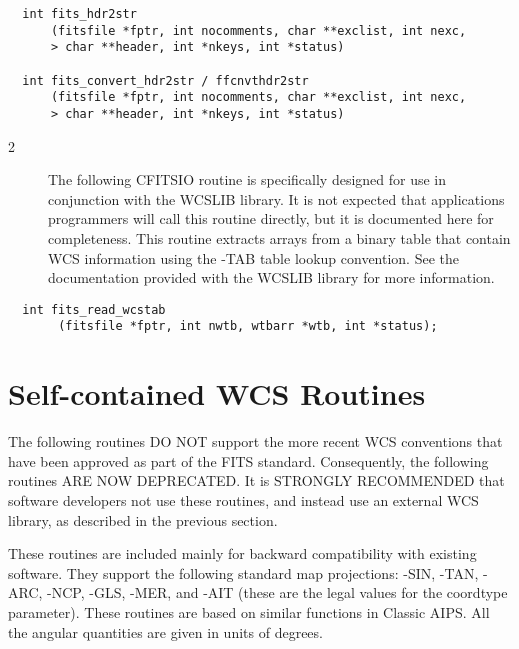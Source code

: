\documentclass[11pt]{book}
\begin{document}
\begin{verbatim}
  int fits_hdr2str
      (fitsfile *fptr, int nocomments, char **exclist, int nexc,
      > char **header, int *nkeys, int *status)

  int fits_convert_hdr2str / ffcnvthdr2str
      (fitsfile *fptr, int nocomments, char **exclist, int nexc,
      > char **header, int *nkeys, int *status)
\end{verbatim}


\begin{description}
\item[2 ]  The following CFITSIO routine is specifically designed for use
in conjunction with the WCSLIB library.  It is not expected that
applications programmers will call this routine directly, but it
is documented here for completeness.  This routine extracts arrays
from a binary table that contain WCS information using the -TAB table
lookup convention.  See the documentation provided with the WCSLIB
 library for more information.  \label{wcstab}
\end{description}

\begin{verbatim}
  int fits_read_wcstab
       (fitsfile *fptr, int nwtb, wtbarr *wtb, int *status);
\end{verbatim}

\section{ Self-contained WCS Routines}

The following routines DO NOT support the more recent WCS conventions
that have been approved as part of the FITS standard.  Consequently,
the following routines ARE NOW DEPRECATED.  It is STRONGLY RECOMMENDED
that software developers not use these routines, and instead use an
external WCS library, as described in the previous section.

These routines are included mainly for backward compatibility with
existing software.  They support the following standard map
projections: -SIN, -TAN, -ARC, -NCP, -GLS, -MER, and -AIT (these are the
legal values for the coordtype parameter).  These routines are based
on similar functions in Classic AIPS.  All the angular quantities are
given in units of degrees.
\end{document}
